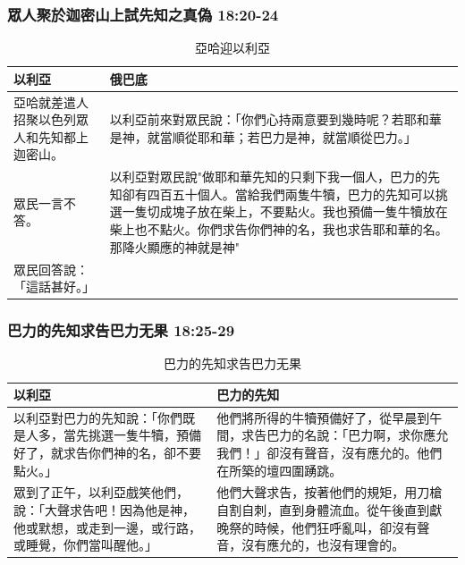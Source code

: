 \subsubsection{眾人聚於迦密山上試先知之真偽 18:20-24} 
\begin{table}[H]
\centering 
\begin{tabular}{p{}|p{14cm}}\hline\hline
以利亞&俄巴底\\\hline
亞哈就差遣人招聚以色列眾人和先知都上迦密山。&以利亞前來對眾民說：「你們心持兩意要到幾時呢？若耶和華是神，就當順從耶和華；若巴力是神，就當順從巴力。」\\\hline
眾民一言不答。&以利亞對眾民說"做耶和華先知的只剩下我一個人，巴力的先知卻有四百五十個人。當給我們兩隻牛犢，巴力的先知可以挑選一隻切成塊子放在柴上，不要點火。我也預備一隻牛犢放在柴上也不點火。你們求告你們神的名，我也求告耶和華的名。那降火顯應的神就是神"\\\hline
眾民回答說：「這話甚好。」&\\\hline
\end{tabular}
\caption{亞哈迎以利亞}
\end{table}


\subsubsection{巴力的先知求告巴力无果 18:25-29} 
\begin{table}[H]
\centering 
\begin{tabular}{p{}|p{10cm}}\hline\hline
以利亞&巴力的先知\\\hline
以利亞對巴力的先知說：「你們既是人多，當先挑選一隻牛犢，預備好了，就求告你們神的名，卻不要點火。」&他們將所得的牛犢預備好了，從早晨到午間，求告巴力的名說：「巴力啊，求你應允我們！」卻沒有聲音，沒有應允的。他們在所築的壇四圍踴跳。\\\hline
眾到了正午，以利亞戲笑他們，說：「大聲求告吧！因為他是神，他或默想，或走到一邊，或行路，或睡覺，你們當叫醒他。」&他們大聲求告，按著他們的規矩，用刀槍自割自刺，直到身體流血。從午後直到獻晚祭的時候，他們狂呼亂叫，卻沒有聲音，沒有應允的，也沒有理會的。\\\hline
\end{tabular}
\caption{巴力的先知求告巴力无果}
\end{table}


